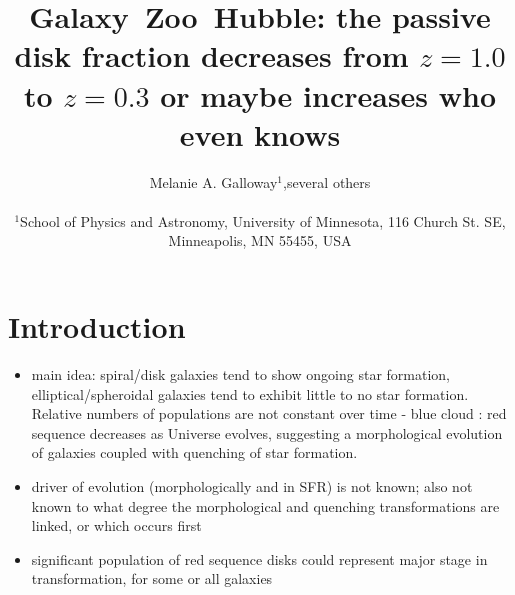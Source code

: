 \documentclass[useAMS,usenatbib]{mn2e}
\begin{document}
\title[Galaxy~Zoo: passive disk fraction]{Galaxy~Zoo~Hubble: the passive disk fraction decreases from $z=1.0$ to $z=0.3$ or maybe increases who even knows}
\author[Galloway et~al.]{\parbox[t]{16cm}{Melanie A. Galloway$^1$,several others
\vspace{0.1in} }\\
$^{1}$School of Physics and Astronomy, University of Minnesota, 116 Church St. SE, Minneapolis, MN 55455, USA\\
   }
\maketitle

\begin{abstract}


\end{abstract}

\section{Introduction}
\label{sec:Intro}

\begin{itemize}
\item main idea: spiral/disk galaxies tend to show ongoing star formation, elliptical/spheroidal galaxies tend to exhibit little to no star formation. Relative numbers of populations are not constant over time - blue cloud : red sequence decreases as Universe evolves, suggesting a morphological evolution of galaxies coupled with quenching of star formation.

\item driver of evolution (morphologically and in SFR) is not known; also not known to what degree the morphological and quenching transformations are linked, or which occurs first

\item significant population of red sequence disks could represent major stage in transformation, for some or all galaxies
 
\end{itemize}
\end{document}
